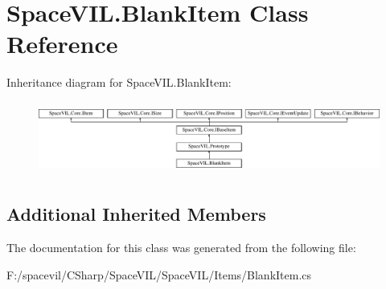 \hypertarget{class_space_v_i_l_1_1_blank_item}{}\section{Space\+V\+I\+L.\+Blank\+Item Class Reference}
\label{class_space_v_i_l_1_1_blank_item}
Inheritance diagram for Space\+V\+I\+L.\+Blank\+Item\+:\begin{figure}[H]
\begin{center}
\leavevmode
\includegraphics[height=2.421622cm]{class_space_v_i_l_1_1_blank_item}
\end{center}
\end{figure}
\subsection*{Additional Inherited Members}


The documentation for this class was generated from the following file\+:\begin{DoxyCompactItemize}
\item 
F\+:/spacevil/\+C\+Sharp/\+Space\+V\+I\+L/\+Space\+V\+I\+L/\+Items/Blank\+Item.\+cs\end{DoxyCompactItemize}
